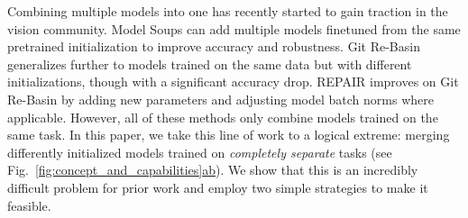 % 


Combining multiple models into one has recently started to gain traction in the vision community.
Model Soups \cite{wortsman2022model} can add multiple models finetuned from the same pretrained initialization to improve accuracy and robustness. Git Re-Basin \cite{ainsworth2022git} generalizes further to models trained on the same data but with different initializations, though with a significant accuracy drop. REPAIR \cite{jordan2022repair} improves on Git Re-Basin by adding new parameters and adjusting model batch norms where applicable.
However, all of these methods only combine models trained on the same task.
In this paper, we take this line of work to a logical extreme: merging differently initialized models trained on \textit{completely separate} tasks (see Fig.~\ref{fig:concept_and_capabilities}\hyperref[fig:concept_and_capabilities]{ab}).
We show
that this is an incredibly difficult problem for prior work 
and
employ two simple strategies to make it feasible.

